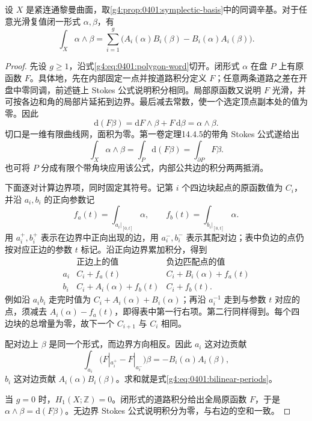 \begin{theorem}
	\label{g4:thm:0401:bilinear-periods}
	设 \(X\) 是紧连通黎曼曲面，取\cref{g4:prop:0401:symplectic-basis}中的同调辛基。对于任意光滑复值闭一形式 \(\alpha,\beta\)，有
	\begin{equation}\label{g4:eq:0401:bilinear-periods}
		\int_X\alpha\wedge\beta
		=\sum_{i=1}^g
		\bigl(A_i(\alpha)B_i(\beta)-B_i(\alpha)A_i(\beta)\bigr).
	\end{equation}
\end{theorem}
\begin{proof}
	先设 \(g\ge1\)，沿式\eqref{g4:eq:0401:polygon-word}切开。闭形式 \(\alpha\) 在盘 \(P\) 上有原函数 \(F\)。具体地，先在内部固定一点并按道路积分定义 \(F\)；任意两条道路之差在开盘中零同调，前述链上 Stokes 公式说明积分相同。局部原函数又说明 \(F\) 光滑，并可按各边和角的局部片延拓到边界。最后减去常数，使一个选定顶点副本处的值为零。因此
	\[
		\mathrm{d}(F\beta)=\mathrm{d}F\wedge\beta+F\,\mathrm{d}\beta
		=\alpha\wedge\beta.
	\]
	切口是一维有限曲线网，面积为零。第一卷定理14.4.5的带角 Stokes 公式遂给出
	\[
		\int_X\alpha\wedge\beta=\int_P\mathrm{d}(F\beta)
		=\int_{\partial P}F\beta.
	\]
	也可将 \(P\) 分成有限个带角块应用该公式，内部公共边的积分两两抵消。

	下面逐对计算边界项，同时固定其符号。记第 \(i\) 个四边块起点的原函数值为 \(C_i\)，并沿 \(a_i,b_i\) 的正向参数记
	\[
		f_a(t)=\int_{a_i|_{[0,t]}}\alpha,
		\qquad f_b(t)=\int_{b_i|_{[0,t]}}\alpha.
	\]
	用 \(a_i^+,b_i^+\) 表示在边界中正向出现的边，用 \(a_i^-,b_i^-\) 表示其配对边；表中负边的点仍按对应正边的参数 \(t\) 标记。沿正向边界累加积分，得到
	\begin{equation}\label{g4:eq:0401:edge-jumps}
		\begin{array}{c|cc}
		 & \text{正边上的值} & \text{负边匹配点的值}\\ \hline
		a_i & C_i+f_a(t) & C_i+B_i(\alpha)+f_a(t)\\
		b_i & C_i+A_i(\alpha)+f_b(t) & C_i+f_b(t).
		\end{array}
	\end{equation}
	例如沿 \(a_i b_i\) 走完时值为 \(C_i+A_i(\alpha)+B_i(\alpha)\)；再沿 \(a_i^{-1}\) 走到与参数 \(t\) 对应的点，须减去 \(A_i(\alpha)-f_a(t)\)，即得表中第一行右项。第二行同样得到。每个四边块的总增量为零，故下一个 \(C_{i+1}\) 与 \(C_i\) 相同。

	配对边上 \(\beta\) 是同一个形式，而边界方向相反。因此 \(a_i\) 这对边贡献
	\[
		\int_{a_i}\bigl(F|_{a_i^+}-F|_{a_i^-}\bigr)\beta
		=-B_i(\alpha)A_i(\beta),
	\]
	\(b_i\) 这对边贡献 \(A_i(\alpha)B_i(\beta)\)。求和就是式\eqref{g4:eq:0401:bilinear-periods}。

	当 \(g=0\) 时，\(H_1(X;\mathbb Z)=0\)。闭形式的道路积分给出全局原函数 \(F\)，于是 \(\alpha\wedge\beta=\mathrm{d}(F\beta)\)。无边界 Stokes 公式说明积分为零，与右边的空和一致。
\end{proof}

